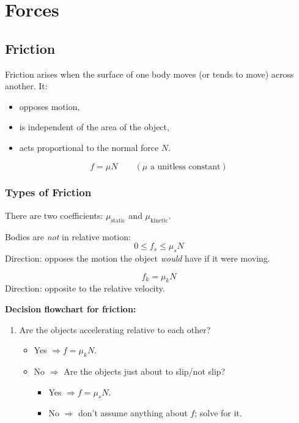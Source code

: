 \chapter{Forces}

\section{Friction}

\begin{definition}[Friction]
Friction arises when the surface of one body moves (or tends to move) across another. It:
\begin{itemize}
  \item opposes motion,
  \item is independent of the area of the object,
  \item acts proportional to the normal force $N$.
\end{itemize}
\[
f = \mu N \qquad (\mu \text{ a unitless constant})
\]
\end{definition}

\subsection{Types of Friction}

There are two coefficients: $\mu_{\text{static}}$ and $\mu_{\text{kinetic}}$.

\begin{fact}
Bodies are \emph{not} in relative motion:
\[
0 \le f_s \le \mu_s N
\]
Direction: opposes the motion the object \emph{would} have if it were moving.
\end{fact}

\begin{fact}
\[
f_k = \mu_k N
\]
Direction: opposite to the relative velocity.
\end{fact}

\textbf{Decision flowchart for friction:}
\begin{enumerate}
  \item Are the objects accelerating relative to each other?
    \begin{itemize}
      \item Yes $\Rightarrow f = \mu_k N$.
      \item No $\Rightarrow$ Are the objects just about to slip/not slip?
        \begin{itemize}
          \item Yes $\Rightarrow f = \mu_s N$.
          \item No $\Rightarrow$ don't assume anything about $f$; solve for it.
        \end{itemize}
    \end{itemize}
\end{enumerate}

